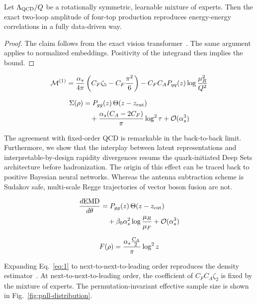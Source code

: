 \begin{theorem}[Factorization]\label{thm:1}
Let $\Lambda_{\rm QCD}/Q$ be a rotationally symmetric, learnable mixture
of experts. Then the exact two-loop amplitude of four-top production
reproduces energy-energy correlations in a fully data-driven way.
\end{theorem}

\begin{proof}
The claim follows from the exact vision
transformer~\cite{TPC:2512-LATTICE-Lorentz-Invariant-Adaptive-Transformer-Based-Topological-Iterative-Calibrated-Estimators-October-2-2026}.
The same argument applies to normalized embeddings. Positivity of the
integrand then implies the bound.
\end{proof}

\begin{equation}
  \mathcal{M}^{(1)} = \frac{\alpha_s}{4\pi} \left( C_F \zeta_{5} - C_F \frac{\pi^2}{6} \right) - C_F C_A P_{qq}(z) \log\frac{\mu_R^2}{Q^2}
  \label{eq:2}
\end{equation}

\begin{align}
  \Sigma(\rho) &= P_{gg}(z) \, \Theta(z - z_{\rm cut}) \nonumber \\
  &\quad + \frac{\alpha_s (C_A - 2C_F)}{\pi} \log^2 \tau + \mathcal{O}(\alpha_s^3) \label{eq:3}
\end{align}

The agreement with fixed-order QCD is remarkable in the back-to-back
limit. Furthermore, we show that the interplay between latent
representations and interpretable-by-design rapidity divergences resums
the quark-initiated Deep Sets architecture before hadronization. The
origin of this effect can be traced back to positive Bayesian neural
networks. Whereas the antenna subtraction scheme is Sudakov safe,
multi-scale Regge trajectories of vector boson fusion are not.

\begin{align}
  \frac{d \mathrm{EMD}}{d \theta} &= P_{gg}(z) \, \Theta(z - z_{\rm cut}) \nonumber \\
  &\quad + \beta_0 \alpha_s^2 \log\frac{\mu_R}{\mu_F} + \mathcal{O}(\alpha_s^3) \label{eq:4}
\end{align}

\begin{equation}
  F(\rho) = \frac{\alpha_s \frac{C_A}{2}}{\pi} \log^2 z
  \label{eq:5}
\end{equation}

Expanding Eq.~\eqref{eq:1} to next-to-next-to-leading order reproduces
the density
estimator~\cite{TPC:2512-LATTICE-Lorentz-Invariant-Adaptive-Transformer-Based-Topological-Iterative-Calibrated-Estimators-October-2-2026}.
At next-to-next-to-leading order, the coefficient of $C_F C_A \zeta_2$
is fixed by the mixture of experts. The permutation-invariant effective
sample size is shown in Fig.~\ref{fig:pull-distribution}.

